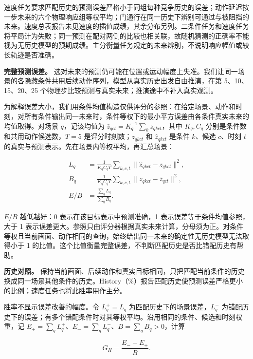 \documentclass[10pt,twocolumn,letterpaper]{article}
\begin{document}
速度任务要求匹配历史的预测误差严格小于同组每种竞争历史的误差；动作延迟按一步未来的六个物理响应组等权平均；门通行在同一历史下辨别可通过与被阻挡的未来。速度总表报告未见速度的插值成绩，其余分布另列。二条件任务和速度任务将平局计为失败；同一预测在配对两侧的比较也相关联，故随机猜测的正确率不能视为无历史模型的预期成绩。主分衡量任务规定的未来辨别，不说明响应幅值或较长轨迹是否准确。

\textbf{完整预测误差。} 选对未来的预测仍可能在位置或运动幅度上失准。我们让同一场景的各隐藏条件共用后续动作序列，模型从真实历史出发自由推演，在第 5、10、15、20、25 个物理步比较预测与真实未来；推演途中不补入真实观测。

为解释误差大小，我们用条件均值构造仅供评分的参照：在给定场景、动作和时刻，对所有条件输出同一未来时，条件等权下的最小平方误差由各条件真实未来的均值取得。对场景 $q$，记该均值为 $\bar z_{qct}=K_q^{-1}\sum_k z_{qkct}$，其中 $K_q,C_q$ 分别是条件数和共用动作候选数，$T=5$ 是评分时刻数；$z_{qkct}$ 和 $\hat z_{qkct}$ 是条件 $k$、候选 $c$、时刻 $t$ 的真实与预测表示。先在场景内等权平均，再汇总场景：

\begin{equation}
\begin{aligned}
L_q&=\frac{1}{K_qC_qT}\sum_{k,c,t}\|\hat z_{qkct}-z_{qkct}\|^2,\\
B_q&=\frac{1}{K_qC_qT}\sum_{k,c,t}\|z_{qkct}-\bar z_{qct}\|^2,\\
E/B&=\frac{\sum_q L_q}{\sum_q B_q}.
\end{aligned}
\label{eq:complete-error}
\end{equation}

$E/B$ 越低越好：0 表示在该目标表示中预测准确，1 表示误差等于条件均值参照，大于 1 表示误差更大。参照只由评分器根据真实未来计算，分母须为正。对条件等权且当前画面、动作相同的查询，始终给出同一未来的确定性无历史模型无法取得小于 1 的比值。这个比值衡量完整误差，不判断匹配历史是否比错配历史有帮助。

\textbf{历史对照。} 保持当前画面、后续动作和真实目标相同，只把匹配当前条件的历史换成同一场景其他条件的历史。History（\%）报告匹配历史使预测误差严格更小的比例；速度任务也将此胜率用作主分。

胜率不显示误差改善的幅度。令 $L_q^+=L_q$ 为匹配历史下的场景误差，$L_q^-$ 为错配历史下的误差；有多个错配条件时对其等权平均。沿用相同的条件、候选和时刻权重，记 $E_+=\sum_qL_q^+$、$E_-=\sum_qL_q^-$、$B=\sum_qB_q>0$，计算

\begin{equation}
G_H=\frac{E_--E_+}{B}.
\label{eq:history-gain}
\end{equation}
\end{document}
